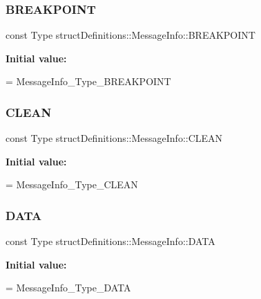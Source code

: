 \subsubsection{\texorpdfstring{B\+R\+E\+A\+K\+P\+O\+I\+NT}{BREAKPOINT}}
{\footnotesize\ttfamily const Type struct\+Definitions\+::\+Message\+Info\+::\+B\+R\+E\+A\+K\+P\+O\+I\+NT\hspace{0.3cm}{\ttfamily [static]}}

{\bfseries Initial value\+:}
\begin{DoxyCode}
=
    MessageInfo\_Type\_BREAKPOINT
\end{DoxyCode}
\hypertarget{classstruct_definitions_1_1_message_info_ab76ef8abd62474e5c9aaac1cba17db7d}{}\label{classstruct_definitions_1_1_message_info_ab76ef8abd62474e5c9aaac1cba17db7d} 
\subsubsection{\texorpdfstring{C\+L\+E\+AN}{CLEAN}}
{\footnotesize\ttfamily const Type struct\+Definitions\+::\+Message\+Info\+::\+C\+L\+E\+AN\hspace{0.3cm}{\ttfamily [static]}}

{\bfseries Initial value\+:}
\begin{DoxyCode}
=
    MessageInfo\_Type\_CLEAN
\end{DoxyCode}
\hypertarget{classstruct_definitions_1_1_message_info_a5bba77f30689b1d99f77035f0c8edbce}{}\label{classstruct_definitions_1_1_message_info_a5bba77f30689b1d99f77035f0c8edbce} 
\subsubsection{\texorpdfstring{D\+A\+TA}{DATA}}
{\footnotesize\ttfamily const Type struct\+Definitions\+::\+Message\+Info\+::\+D\+A\+TA\hspace{0.3cm}{\ttfamily [static]}}

{\bfseries Initial value\+:}
\begin{DoxyCode}
=
    MessageInfo\_Type\_DATA
\end{DoxyCode}
\hypertarget{classstruct_definitions_1_1_message_info_ab85e4017d627aa6500989fc2ec9d547b}{}\label{classstruct_definitions_1_1_message_info_ab85e4017d627aa6500989fc2ec9d547b} 
